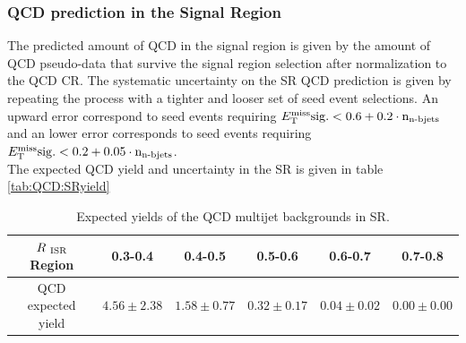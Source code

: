 \subsubsection*{QCD prediction in the Signal Region}

\indent The predicted amount of QCD in the signal region is given by the amount of QCD pseudo-data that survive the signal region selection after normalization to the QCD CR. The systematic uncertainty on the SR QCD prediction is given by repeating the process with a tighter and looser set of seed event selections.  An upward error correspond to seed events requiring $E_{\mathrm{T}}^{\mathrm{miss}}\rm{sig.} < 0.6 + 0.2\cdot n_{\textup{n-bjets}}$ and an lower error corresponds to seed events requiring $E_{\mathrm{T}}^{\mathrm{miss}}\rm{sig.} < 0.2 + 0.05\cdot n_{\textup{n-bjets}}$. \\

\indent The expected QCD yield and uncertainty in the SR is given in table \ref{tab:QCD:SRyield}

\begin{table}[!htbp]
  \caption{Expected yields of the QCD multijet backgrounds in SR.}
  \label{tab:QCDYields}
  \begin{center}
    \begin{tabular}{c|c|c|c|c|c} \hline\hline
$R_{~\mathrm{ISR}}$ Region       & 0.3-0.4              & 0.4-0.5              & 0.5-0.6              & 0.6-0.7             & 0.7-0.8 \\ \hline
QCD expected yield & $4.56\pm2.38$ & $1.58\pm0.77$ & $0.32\pm0.17$ & $0.04\pm0.02$ & $0.00\pm0.00$ \\ \hline \hline
    \end{tabular}
  \end{center}
\end{table}%

